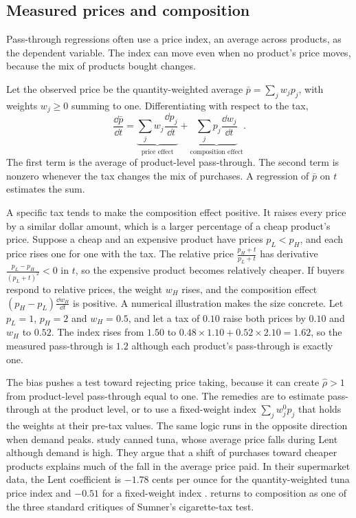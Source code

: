 \subsection{Measured prices and composition}\label{sec:02-pt-composition}

Pass-through regressions often use a price index, an average across products, as the dependent variable. The
index can move even when no product's price moves, because the mix of products bought changes.

\begin{remark}\label{rem:02-pt-composition}
Let the observed price be the quantity-weighted average $\bar p = \sum_j w_jp_j$, with weights $w_j \ge 0$
summing to one. Differentiating with respect to the tax,
\begin{equation}\label{eq:02-pt-composition}
\frac{\dd \bar p}{\dd t} = \underbrace{\sum_j w_j\frac{\dd p_j}{\dd t}}_{\text{price effect}}
+ \underbrace{\sum_j p_j\frac{\dd w_j}{\dd t}}_{\text{composition effect}} .
\end{equation}
The first term is the average of product-level pass-through. The second term is nonzero whenever the tax changes
the mix of purchases. A regression of $\bar p$ on $t$ estimates the sum.
\end{remark}

A specific tax tends to make the composition effect positive. It raises every price by a similar dollar amount,
which is a larger percentage of a cheap product's price. Suppose a cheap and an expensive product have prices
$p_L < p_H$, and each price rises one for one with the tax. The relative price $\frac{p_H + t}{p_L + t}$ has
derivative $\frac{p_L - p_H}{(p_L + t)^2} < 0$ in $t$, so the expensive product becomes relatively cheaper. If
buyers respond to relative prices, the weight $w_H$ rises, and the composition effect
$(p_H - p_L)\frac{\dd w_H}{\dd t}$ is positive. A numerical illustration makes the size concrete. Let $p_L = 1$,
$p_H = 2$ and $w_H = 0.5$, and let a tax of $0.10$ raise both prices by $0.10$ and $w_H$ to $0.52$. The index
rises from $1.50$ to $0.48 \times 1.10 + 0.52 \times 2.10 = 1.62$, so the measured pass-through is $1.2$ although
each product's pass-through is exactly one.

The bias pushes a test toward rejecting price taking, because it can create $\hat\rho > 1$ from product-level
pass-through equal to one. The remedies are to estimate pass-through at the product level, or to use a
fixed-weight index $\sum_j w_j^0 p_j$ that holds the weights at their pre-tax values. The same logic runs in the
opposite direction when demand peaks. \citet{NevoHatzitaskos2005} study canned tuna, whose average price falls
during Lent although demand is high. They argue that a shift of purchases toward cheaper products explains much
of the fall in the average price paid. In their supermarket data, the Lent coefficient is $-1.78$ cents per ounce
for the quantity-weighted tuna price index and $-0.51$ for a fixed-weight index \citep[p.~13 and
Table~3]{NevoHatzitaskos2005}.
 returns to composition as one of the three standard critiques of Sumner's cigarette-tax test.

